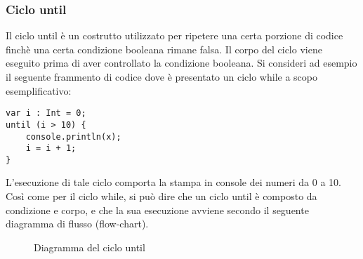 \subsubsection{Ciclo until}
Il ciclo until è un costrutto utilizzato per ripetere una certa porzione di codice finchè una certa condizione booleana rimane falsa. Il corpo del 
ciclo viene eseguito prima di aver controllato la condizione booleana. Si consideri ad esempio il seguente frammento di codice dove è presentato un ciclo 
while a scopo esemplificativo:

\vspace{0.5cm}

\begin{lstlisting}[frame=single]
var i : Int = 0;
until (i > 10) {
    console.println(x);
    i = i + 1;
}
\end{lstlisting}

\vspace{0.5cm}

L’esecuzione di tale ciclo comporta la stampa in console dei numeri da 0 a 10. Così come per il ciclo while, si può dire che un ciclo until è 
composto da condizione e corpo, e che la sua esecuzione avviene secondo il seguente diagramma di flusso (flow-chart).

\vspace{0.5cm}

\begin{figure}[h]
    \centering
    \caption{Diagramma del ciclo until}
    \label{fig:flowchart2}
\end{figure}